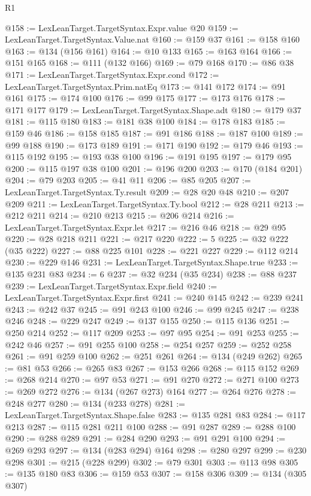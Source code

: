 \begin{lexlean}{R1}
\begin{coremodule}
{{{{{{{{{{{{{{{{{{{{{{{{{{{{{{{{{{{{{{{{{{{{{{{{{{{{{{{{{@158 := LexLeanTarget.TargetSyntax.Expr.value @20
@159 := LexLeanTarget.TargetSyntax.Value.nat
@160 := @159 @37
@161 := @158 @160
@163 := @134 (@156 @161)
@164 := @10 @133
@165 := @163 @164
@166 := @151 @165
@168 := @111 (@132 @166)
@169 := @79 @168
@170 := @86 @38
@171 := LexLeanTarget.TargetSyntax.Expr.cond
@172 := LexLeanTarget.TargetSyntax.Prim.natEq
@173 := @141 @172
@174 := @91 @161
@175 := @174 @100
@176 := @99 @175
@177 := @173 @176
@178 := @171 @177
@179 := LexLeanTarget.TargetSyntax.Shape.adt
@180 := @179 @37
@181 := @115 @180
@183 := @181 @38 @100
@184 := @178 @183
@185 := @159 @46
@186 := @158 @185
@187 := @91 @186
@188 := @187 @100
@189 := @99 @188
@190 := @173 @189
@191 := @171 @190
@192 := @179 @46
@193 := @115 @192
@195 := @193 @38 @100
@196 := @191 @195
@197 := @179 @95
@200 := @115 @197 @38 @100
@201 := @196 @200
@203 := @170 (@184 @201)
@204 := @79 @203
@205 := @41 @11
@206 := @85 @205
@207 := LexLeanTarget.TargetSyntax.Ty.result
@209 := @28 @20 @48
@210 := @207 @209
@211 := LexLeanTarget.TargetSyntax.Ty.bool
@212 := @28 @211
@213 := @212 @211
@214 := @210 @213
@215 := @206 @214
@216 := LexLeanTarget.TargetSyntax.Expr.let
@217 := @216 @46
@218 := @29 @95
@220 := @28 @218 @211
@221 := @217 @220
@222 := 5
@225 := @32 @222 (@35 @222)
@227 := @88 @225 @101
@228 := @221 @227
@229 := @112 @214
@230 := @229 @146
@231 := LexLeanTarget.TargetSyntax.Shape.true
@233 := @135 @231 @83
@234 := 6
@237 := @32 @234 (@35 @234)
@238 := @88 @237
@239 := LexLeanTarget.TargetSyntax.Expr.field
@240 := LexLeanTarget.TargetSyntax.Expr.first
@241 := @240 @145
@242 := @239 @241
@243 := @242 @37
@245 := @91 @243 @100
@246 := @99 @245
@247 := @238 @246
@248 := @229 @247
@249 := @137 @155
@250 := @115 @136
@251 := @250 @214
@252 := @117 @209
@253 := @97 @95
@254 := @91 @253
@255 := @242 @46
@257 := @91 @255 @100
@258 := @254 @257
@259 := @252 @258
@261 := @91 @259 @100
@262 := @251 @261
@264 := @134 (@249 @262)
@265 := @81 @53
@266 := @265 @83
@267 := @153 @266
@268 := @115 @152
@269 := @268 @214
@270 := @97 @53
@271 := @91 @270
@272 := @271 @100
@273 := @269 @272
@276 := @134 (@267 @273) @164
@277 := @264 @276
@278 := @248 @277
@280 := @134 (@233 @278)
@281 := LexLeanTarget.TargetSyntax.Shape.false
@283 := @135 @281 @83
@284 := @117 @213
@287 := @115 @281 @211 @100
@288 := @91 @287
@289 := @288 @100
@290 := @288 @289
@291 := @284 @290
@293 := @91 @291 @100
@294 := @269 @293
@297 := @134 (@283 @294) @164
@298 := @280 @297
@299 := @230 @298
@301 := @215 (@228 @299)
@302 := @79 @301
@303 := @113 @98
@305 := @135 @180 @83
@306 := @159 @53
@307 := @158 @306
@309 := @134 (@305 @307)
}}}}}}}}}}}}}}}}}}}}}}}}}}}}}}}}}}}}}}}}}}}}}}}}}}}}}}}}}
\end{coremodule}
\end{lexlean}
